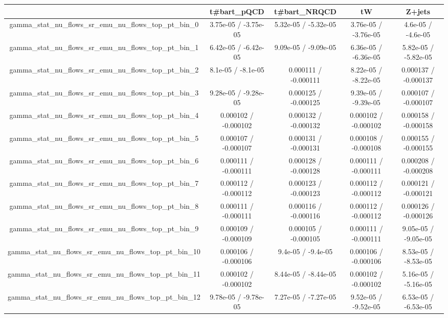\documentclass[10pt]{article}
\begin{document}
\begin{table}[htbp]
\begin{center}
\begin{tabular}{|c|c|c|c|c|}
\hline 
      & t#bar{t}_{pQCD}      & t#bar{t}_{NRQCD}      & tW      & Z+jets \\ 
\hline 
  gamma_stat_nu_flows_sr_emu_nu_flows_top_pt_bin_0 & 3.75e-05 / -3.75e-05 & 5.32e-05 / -5.32e-05 & 3.76e-05 / -3.76e-05 & 4.6e-05 / -4.6e-05 \\ 
  gamma_stat_nu_flows_sr_emu_nu_flows_top_pt_bin_1 & 6.42e-05 / -6.42e-05 & 9.09e-05 / -9.09e-05 & 6.36e-05 / -6.36e-05 & 5.82e-05 / -5.82e-05 \\ 
  gamma_stat_nu_flows_sr_emu_nu_flows_top_pt_bin_2 & 8.1e-05 / -8.1e-05 & 0.000111 / -0.000111 & 8.22e-05 / -8.22e-05 & 0.000137 / -0.000137 \\ 
  gamma_stat_nu_flows_sr_emu_nu_flows_top_pt_bin_3 & 9.28e-05 / -9.28e-05 & 0.000125 / -0.000125 & 9.39e-05 / -9.39e-05 & 0.000107 / -0.000107 \\ 
  gamma_stat_nu_flows_sr_emu_nu_flows_top_pt_bin_4 & 0.000102 / -0.000102 & 0.000132 / -0.000132 & 0.000102 / -0.000102 & 0.000158 / -0.000158 \\ 
  gamma_stat_nu_flows_sr_emu_nu_flows_top_pt_bin_5 & 0.000107 / -0.000107 & 0.000131 / -0.000131 & 0.000108 / -0.000108 & 0.000155 / -0.000155 \\ 
  gamma_stat_nu_flows_sr_emu_nu_flows_top_pt_bin_6 & 0.000111 / -0.000111 & 0.000128 / -0.000128 & 0.000111 / -0.000111 & 0.000208 / -0.000208 \\ 
  gamma_stat_nu_flows_sr_emu_nu_flows_top_pt_bin_7 & 0.000112 / -0.000112 & 0.000123 / -0.000123 & 0.000112 / -0.000112 & 0.000121 / -0.000121 \\ 
  gamma_stat_nu_flows_sr_emu_nu_flows_top_pt_bin_8 & 0.000111 / -0.000111 & 0.000116 / -0.000116 & 0.000112 / -0.000112 & 0.000126 / -0.000126 \\ 
  gamma_stat_nu_flows_sr_emu_nu_flows_top_pt_bin_9 & 0.000109 / -0.000109 & 0.000105 / -0.000105 & 0.000111 / -0.000111 & 9.05e-05 / -9.05e-05 \\ 
  gamma_stat_nu_flows_sr_emu_nu_flows_top_pt_bin_10 & 0.000106 / -0.000106 & 9.4e-05 / -9.4e-05 & 0.000106 / -0.000106 & 8.53e-05 / -8.53e-05 \\ 
  gamma_stat_nu_flows_sr_emu_nu_flows_top_pt_bin_11 & 0.000102 / -0.000102 & 8.44e-05 / -8.44e-05 & 0.000102 / -0.000102 & 5.16e-05 / -5.16e-05 \\ 
  gamma_stat_nu_flows_sr_emu_nu_flows_top_pt_bin_12 & 9.78e-05 / -9.78e-05 & 7.27e-05 / -7.27e-05 & 9.52e-05 / -9.52e-05 & 6.53e-05 / -6.53e-05 \\ 

\end{tabular}
\end{center}
\end{table}
\end{document}
